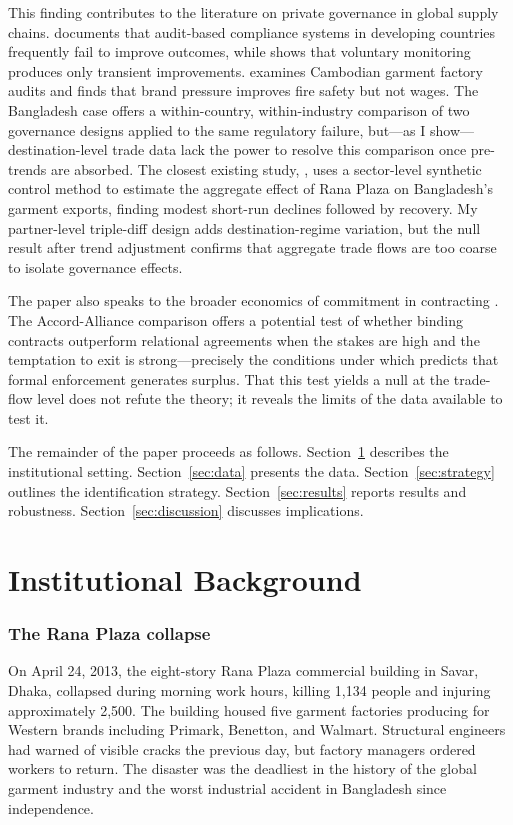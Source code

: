 \documentclass[12pt]{article}
\begin{document}
This finding contributes to the literature on private governance in global supply chains. \citet{locke2013promise} documents that audit-based compliance systems in developing countries frequently fail to improve outcomes, while \citet{distelhorst2015beyond} shows that voluntary monitoring produces only transient improvements. \citet{oka2010fires} examines Cambodian garment factory audits and finds that brand pressure improves fire safety but not wages. The Bangladesh case offers a within-country, within-industry comparison of two governance designs applied to the same regulatory failure, but---as I show---destination-level trade data lack the power to resolve this comparison once pre-trends are absorbed. The closest existing study, \citet{bossavie2023reputation}, uses a sector-level synthetic control method to estimate the aggregate effect of Rana Plaza on Bangladesh's garment exports, finding modest short-run declines followed by recovery. My partner-level triple-diff design adds destination-regime variation, but the null result after trend adjustment confirms that aggregate trade flows are too coarse to isolate governance effects.

The paper also speaks to the broader economics of commitment in contracting \citep{williamson1985economic}. The Accord-Alliance comparison offers a potential test of whether binding contracts outperform relational agreements when the stakes are high and the temptation to exit is strong---precisely the conditions under which \citet{hart1988incomplete} predicts that formal enforcement generates surplus. That this test yields a null at the trade-flow level does not refute the theory; it reveals the limits of the data available to test it.

The remainder of the paper proceeds as follows. Section~\ref{sec:background} describes the institutional setting. Section~\ref{sec:data} presents the data. Section~\ref{sec:strategy} outlines the identification strategy. Section~\ref{sec:results} reports results and robustness. Section~\ref{sec:discussion} discusses implications.


\section{Institutional Background}
\label{sec:background}

\subsubsection*{The Rana Plaza collapse} On April 24, 2013, the eight-story Rana Plaza commercial building in Savar, Dhaka, collapsed during morning work hours, killing 1,134 people and injuring approximately 2,500. The building housed five garment factories producing for Western brands including Primark, Benetton, and Walmart. Structural engineers had warned of visible cracks the previous day, but factory managers ordered workers to return. The disaster was the deadliest in the history of the global garment industry and the worst industrial accident in Bangladesh since independence.
\end{document}
